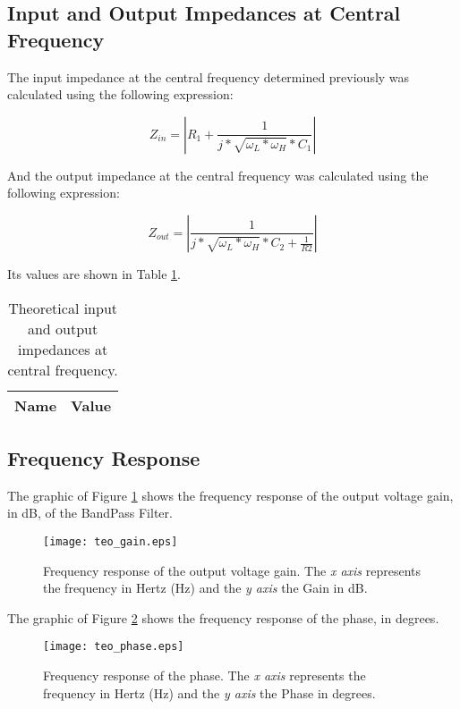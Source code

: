 \subsection{Input and Output Impedances at Central Frequency}

The input impedance at the central frequency determined previously was calculated using the following expression:

\begin {equation}
	Z_{in} = |R_1 + \frac{1}{j*\sqrt{\omega_L * \omega_H }*C_1}|
	\label{eq:Zin}
\end{equation}  

And the output impedance at the central frequency was calculated using the following expression:

\begin {equation}
       Z_{out} = |\frac{1}{j*\sqrt{\omega_L * \omega_H }*C_2+\frac{1}{R2}}|
	\label{eq:Zout}
\end{equation} 


Its values are shown in Table \ref{tab:teoresults2}.

\begin{table}[H]
	\centering
	\begin{tabular}{|l|r|}
		\hline    
		{\bf Name} & {\bf Value} \\ \hline
		
	\end{tabular}
	\caption{Theoretical input and output impedances at central frequency.}
	\label{tab:teoresults2}
\end{table}


\subsection{Frequency Response}

The graphic of Figure \ref{fig:teo_gain} shows the frequency response of the output voltage gain, in dB, of the BandPass Filter.

\begin{figure}[H] \centering
	\texttt{[image: teo\_gain.eps]}
	\caption{Frequency response of the output voltage gain. The \textit{x axis} represents the frequency in Hertz (Hz) and the \textit{y axis} the Gain in dB.}
	\label{fig:teo_gain}
\end{figure}

The graphic of Figure \ref{fig:teo_phase} shows the frequency response of the phase, in degrees.

\begin{figure}[H] \centering
	\texttt{[image: teo\_phase.eps]}
	\caption {Frequency response of the phase. The \textit{x axis} represents the frequency in Hertz (Hz) and the \textit{y axis} the Phase in degrees.}
	\label{fig:teo_phase}
\end{figure}




